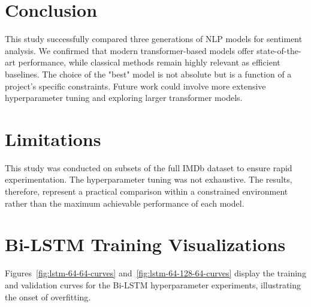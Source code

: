 \documentclass[11pt]{article}
\begin{document}
\section{Conclusion}
This study successfully compared three generations of NLP models for sentiment analysis. We confirmed that modern transformer-based models offer state-of-the-art performance, while classical methods remain highly relevant as efficient baselines. The choice of the "best" model is not absolute but is a function of a project's specific constraints. Future work could involve more extensive hyperparameter tuning and exploring larger transformer models.

\section*{Limitations}
This study was conducted on subsets of the full IMDb dataset to ensure rapid experimentation. The hyperparameter tuning was not exhaustive. The results, therefore, represent a practical comparison within a constrained environment rather than the maximum achievable performance of each model.

\appendix

\section{Bi-LSTM Training Visualizations}
\label{sec:appendix}

Figures~\ref{fig:lstm-64-64-curves} and~\ref{fig:lstm-64-128-64-curves} display the training and validation curves for the Bi-LSTM hyperparameter experiments, illustrating the onset of overfitting.
\end{document}
